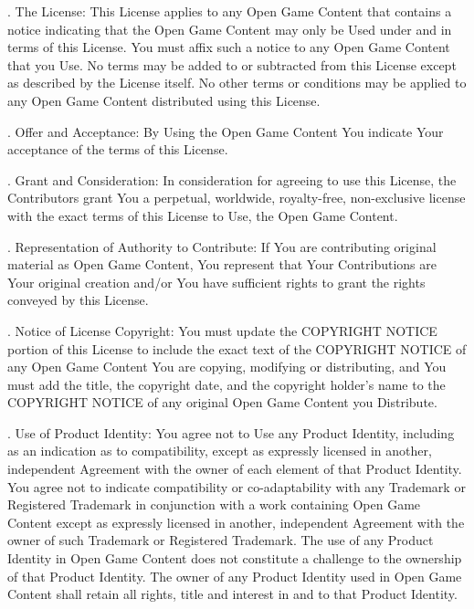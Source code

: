 \begin{multicols}{2}
\vspace{1em} . The License: This License applies to any Open Game Content that contains a notice indicating that the Open Game Content may only be Used under and in terms of this License. You must affix such a notice to any Open Game Content that you Use. No terms may be added to or subtracted from this License except as described by the License itself. No other terms or conditions may be applied to any Open Game Content distributed using this License. 

\vspace{1em} . Offer and Acceptance: By Using the Open Game Content You indicate Your acceptance of the terms of this License. 

\vspace{1em} . Grant and Consideration: In consideration for agreeing to use this License, the Contributors grant You a perpetual, worldwide, royalty-free, non-exclusive license with the exact terms of this License to Use, the Open Game Content. 

\vspace{1em} . Representation of Authority to Contribute: If You are contributing original material as Open Game Content, You represent that Your Contributions are Your original creation and/or You have sufficient rights to grant the rights conveyed by this License. 

\vspace{1em} . Notice of License Copyright: You must update the COPYRIGHT NOTICE portion of this License to include the exact text of the COPYRIGHT NOTICE of any Open Game Content You are copying, modifying or distributing, and You must add the title, the copyright date, and the copyright holder's name to the COPYRIGHT NOTICE of any original Open Game Content you Distribute. 

\vspace{1em} . Use of Product Identity: You agree not to Use any Product Identity, including as an indication as to compatibility, except as expressly licensed in another, independent Agreement with the owner of each element of that Product Identity. You agree not to indicate compatibility or co-adaptability with any Trademark or Registered Trademark in conjunction with a work containing Open Game Content except as expressly licensed in another, independent Agreement with the owner of such Trademark or Registered Trademark. The use of any Product Identity in Open Game Content does not constitute a challenge to the ownership of that Product Identity. The owner of any Product Identity used in Open Game Content shall retain all rights, title and interest in and to that Product Identity. 


\end{multicols}

